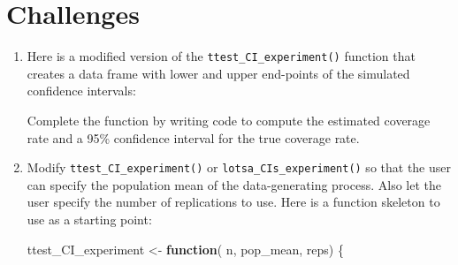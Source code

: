 \documentclass[
]{book}
\newenvironment{Shaded}{\begin{snugshade}}{\end{snugshade}}
\newcommand{\AttributeTok}[1]{\textcolor[rgb]{0.13,0.29,0.53}{#1}}
\newcommand{\CommentTok}[1]{\textcolor[rgb]{0.56,0.35,0.01}{\textit{#1}}}
\newcommand{\ControlFlowTok}[1]{\textcolor[rgb]{0.13,0.29,0.53}{\textbf{#1}}}
\newcommand{\DecValTok}[1]{\textcolor[rgb]{0.00,0.00,0.81}{#1}}
\newcommand{\FunctionTok}[1]{\textcolor[rgb]{0.13,0.29,0.53}{\textbf{#1}}}
\newcommand{\NormalTok}[1]{#1}
\newcommand{\OtherTok}[1]{\textcolor[rgb]{0.56,0.35,0.01}{#1}}
\newcommand{\SpecialCharTok}[1]{\textcolor[rgb]{0.81,0.36,0.00}{\textbf{#1}}}
\begin{document}
\section{Challenges}\label{challenges}

\begin{enumerate}
\def\labelenumi{\arabic{enumi}.}
\setcounter{enumi}{3}
\item
  Here is a modified version of the \texttt{ttest\_CI\_experiment()} function that creates a data frame with lower and upper end-points of the simulated confidence intervals:

\begin{Shaded}
\end{Shaded}

  Complete the function by writing code to compute the estimated coverage rate and a 95\% confidence interval for the true coverage rate.
\item
  Modify \texttt{ttest\_CI\_experiment()} or \texttt{lotsa\_CIs\_experiment()} so that the user can specify the population mean of the data-generating process. Also let the user specify the number of replications to use. Here is a function skeleton to use as a starting point:

\begin{Shaded}
\begin{Highlighting}[]
\NormalTok{ttest\_CI\_experiment }\OtherTok{\textless{}{-}} \ControlFlowTok{function}\NormalTok{( n, pop\_mean, reps) \{}


\end{Highlighting}
\end{Shaded}
\end{enumerate}
\end{document}
